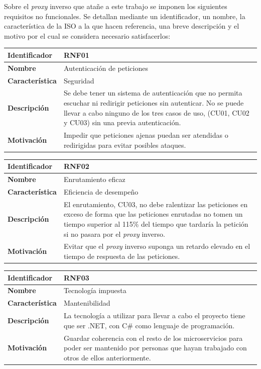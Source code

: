 \documentclass[11pt,spanish,listoffigures]{tfgetsinf}
\begin{document}
Sobre el \emph{proxy} inverso que atañe a este trabajo se imponen los siguientes requisitos no funcionales. Se detallan mediante un identificador, un nombre, la característica de la ISO a la que hacen referencia, una breve descripción y el motivo por el cual se considera necesario satisfacerlos:

\begin{center} \begin{tabular}{| l | p{11.3cm} |}
\hline
\textbf{Identificador} & RNF01
\\ \hline
\textbf{Nombre} & Autenticación de peticiones
\\ \hline
\textbf{Característica} & Seguridad
\\ \hline
\textbf{Descripción} & Se debe tener un sistema de autenticación que no permita escuchar ni redirigir peticiones sin autenticar. No se puede llevar a cabo ninguno de los tres casos de uso, (CU01, CU02 y CU03) sin una previa autenticación.
\\ \hline
\textbf{Motivación} & Impedir que peticiones ajenas puedan ser atendidas o redirigidas para evitar posibles ataques.
\\ \hline \end{tabular} \end{center}

\begin{center} \begin{tabular}{| l | p{11.3cm} |}
\hline
\textbf{Identificador} & RNF02
\\ \hline
\textbf{Nombre} & Enrutamiento eficaz
\\ \hline
\textbf{Característica} & Eficiencia de desempeño
\\ \hline
\textbf{Descripción} & El enrutamiento, CU03, no debe ralentizar las peticiones en exceso de forma que las peticiones enrutadas no tomen un tiempo superior al 115\% del tiempo que tardaría la petición si no pasara por el \emph{proxy} inverso.
\\ \hline
\textbf{Motivación} & Evitar que el \emph{proxy} inverso suponga un retardo elevado en el tiempo de respuesta de las peticiones.
\\ \hline \end{tabular} \end{center}

\begin{center} \begin{tabular}{| l | p{11.3cm} |}
\hline
\textbf{Identificador} & RNF03
\\ \hline
\textbf{Nombre} & Tecnología impuesta
\\ \hline
\textbf{Característica} & Mantenibilidad
\\ \hline
\textbf{Descripción} & La tecnología a utilizar para llevar a cabo el proyecto tiene que ser .NET, con C\# como lenguaje de programación.
\\ \hline
\textbf{Motivación} & Guardar coherencia con el resto de los microservicios para poder ser mantenido por personas que hayan trabajado con otros de ellos anteriormente.
\\ \hline \end{tabular} \end{center}
\end{document}
